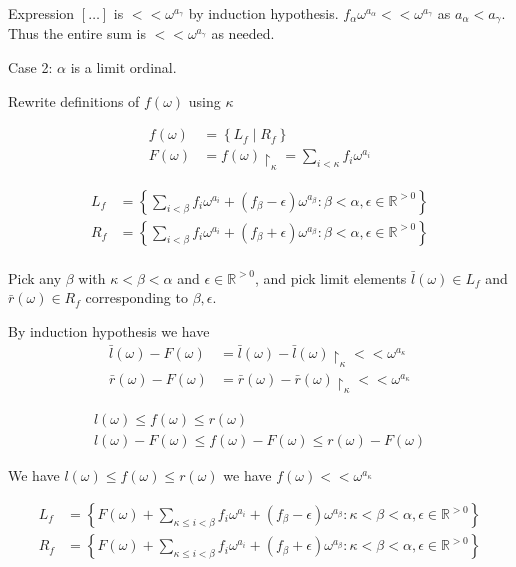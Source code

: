 \documentclass{article}
\newcommand{\brac}[1]{\left[ #1 \right]}
\newcommand{\curly}[1]{\left\{ #1 \right\}}
\newcommand{\R}{\mathbb{R}}
\newcommand{\w}{\omega}
\newcommand{\midr}[1]{\restriction_{#1}}
\begin{document}
Expression $\brac{\ldots}$ is $<< \w^{a_\gamma}$ by induction hypothesis. $f_\alpha \w^{a_\alpha} << \w^{a_\gamma}$ as $a_\alpha < a_\gamma$. Thus the entire sum is $<< \w^{a_\gamma}$ as needed.

Case 2: $\alpha$ is a limit ordinal.

Rewrite definitions of $f(\w)$ using $\kappa$

\begin{align*}
  f(\w) &= \curly{L_f \mid R_f} \\
  F(\w) &= f(\w)\midr\kappa = \sum_{i < \kappa} f_i \w^{a_i}
\end{align*}

\begin{align*}
  L_f &= \curly{\sum_{i < \beta} f_i \w^{a_i} + (f_\beta - \epsilon) \w^{a_\beta}
	\colon \beta < \alpha, \epsilon \in \R^{>0}} \\
  R_f &= \curly{\sum_{i < \beta} f_i \w^{a_i} + (f_\beta + \epsilon) \w^{a_\beta}
	\colon \beta < \alpha, \epsilon \in \R^{>0}} \\
\end{align*}

Pick any $\beta$ with $\kappa < \beta < \alpha$ and $\epsilon \in \R^{>0}$,
and pick limit elements $\bar l(\w) \in L_f$ and $\bar r(\w) \in R_f$ corresponding to $\beta, \epsilon$.

By induction hypothesis we have 
\begin{align*}
	\bar l(\w) - F(\w) &= \bar l(\w) - \bar l(\w)\midr\kappa <<  \w^{a_\kappa} \\
	\bar r(\w) - F(\w) &= \bar r(\w) - \bar r(\w)\midr\kappa <<  \w^{a_\kappa}
\end{align*}

\begin{align*}
	l(\w) \leq f(\w) \leq r(\w) \\
	l(\w) - F(\w) \leq f(\w) - F(\w) \leq r(\w) - F(\w)
\end{align*}

We have $l(\w) \leq f(\w) \leq r(\w)$ we have $f(\w) << \w^{a_\kappa}$


\begin{align*}
  L_f &= \curly{F(\w) + \sum_{\kappa \leq i < \beta} f_i \w^{a_i} + (f_\beta - \epsilon) \w^{a_\beta}
	\colon \kappa < \beta < \alpha, \epsilon \in \R^{>0}} \\
  R_f &= \curly{F(\w) + \sum_{\kappa \leq i < \beta} f_i \w^{a_i} + (f_\beta + \epsilon) \w^{a_\beta}
	\colon \kappa < \beta < \alpha, \epsilon \in \R^{>0}} \\
\end{align*}
\end{document}
